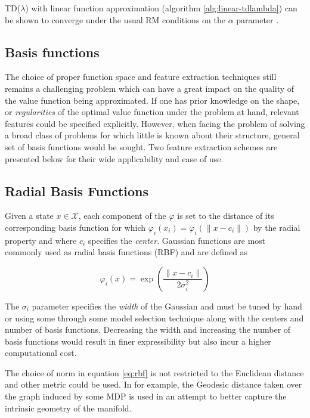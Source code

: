 TD($\lambda$) with linear function approximation (algorithm \ref{alg:linear-tdlambda}) can be shown to converge under the usual RM conditions on the $\alpha$
parameter \cite{Tsitsiklis1997}.

\subsection{Basis functions}

The choice of proper function space and feature extraction techniques still remains a
challenging problem which can have a great impact on the quality of the value function
being approximated. If one has prior knowledge on the shape, or \textit{regularities}
of the optimal value function under the problem at hand, relevant features could be
specified explicitly. However, when facing the problem of solving a broad class of
problems for which little is known about their structure, general set of basis functions
would be sought. Two feature extraction schemes are presented below for their wide
applicability and ease of use. 

\subsection{Radial Basis Functions}

Given a state $x \in \mathcal{X}$, each component of the $\varphi$ is set to the
distance of its corresponding basis function for which $\varphi_i(x_i) = \varphi_i(\|x -
c_i\|)$ by the radial property and where $c_i$ specifies the \textit{center}. Gaussian
functions are most commonly used as radial basis functions (RBF) and are defined as

\begin{equation}
\varphi_i(x) = \exp\left( \frac{\| x - c_i\|}{2\sigma_i^2}\right)
\label{eq:rbf}
\end{equation}

The $\sigma_i$ parameter specifies the \textit{width} of the Gaussian and must be
tuned by hand or using some through some model selection technique along with the
centers and number of basis functions. Decreasing the width and increasing the
number of basis functions would result in finer expressibility but also incur a higher
computational cost. 

The choice of norm in equation \ref{eq:rbf} is not restricted to the Euclidean distance
and other metric could be used. In \cite{Sugiyama2008} for example, the Geodesic
distance taken over the graph induced by some MDP is used in an attempt to better
capture the intrinsic geometry of the manifold.
 
